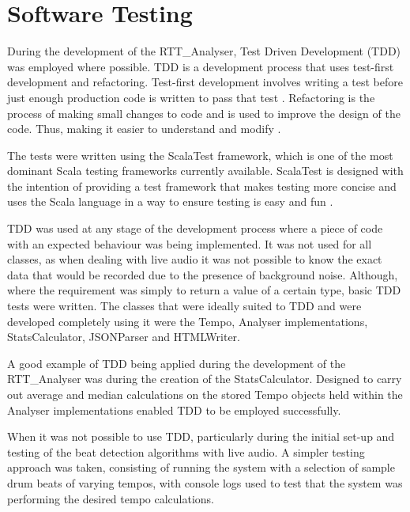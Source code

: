 \documentclass[a4paper, 11pt]{article}
\begin{document}
\maketitle{}\section{Software Testing}
During the development of the RTT\_Analyser, Test Driven Development (TDD) was employed where possible. TDD is a development process that uses test-first development and refactoring. Test-first development involves writing a test before just enough production code is written to pass that test \cite{tdd1}. Refactoring is the process of making small changes to code and is used to improve the design of the code. Thus, making it easier to understand and modify \cite{tdd2}. \par

The tests were written using the ScalaTest framework, which is one of the most dominant Scala testing frameworks currently available. ScalaTest is designed with the intention of providing a test framework that makes testing more concise and uses the Scala language in a way to ensure testing is easy and fun \cite{testingScala}.

TDD was used at any stage of the development process where a piece of code with an expected behaviour was being implemented. It was not used for all classes, as when dealing with live audio it was not possible to know the exact data that would be recorded due to the presence of background noise. Although, where the requirement was simply to return a value of a certain type, basic TDD tests were written. The classes that were ideally suited to TDD and were developed completely using it were the Tempo, Analyser implementations, StatsCalculator, JSONParser and HTMLWriter. \par

A good example of TDD being applied during the development of the RTT\_Analyser was during the creation of the StatsCalculator. Designed to carry out average and median calculations on the stored Tempo objects held within the Analyser implementations enabled TDD to be employed successfully.

When it was not possible to use TDD, particularly during the initial set-up and testing of the beat detection algorithms with live audio. A simpler testing approach was taken, consisting of running the system with a selection of sample drum beats of varying tempos, with console logs used to test that the system was performing the desired tempo calculations.
\end{document}
